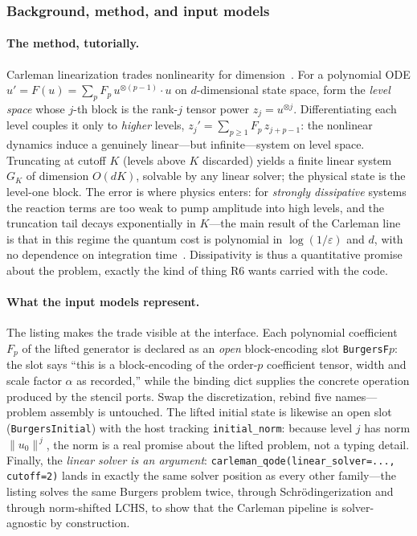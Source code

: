 \subsubsection{Background, method, and input models}
\label{app:carleman-method}

\paragraph{The method, tutorially.}
Carleman linearization trades nonlinearity for
dimension~\cite{liu2021pnas,liu2023carleman}.  For a polynomial ODE
$u'=F(u)=\sum_p F_p\,u^{\otimes(p-1)}\!\cdot u$ on $d$-dimensional state
space, form the \emph{level space} whose $j$-th block is the rank-$j$
tensor power $z_j = u^{\otimes j}$.  Differentiating each level couples it
only to \emph{higher} levels, $z_j' = \sum_{p\ge 1} F_p\, z_{j+p-1}$: the
nonlinear dynamics induce a genuinely linear---but infinite---system on
level space.  Truncating at cutoff $K$ (levels above $K$ discarded)
yields a finite linear system $G_K$ of dimension $O(dK)$, solvable by any
linear solver; the physical state is the level-one block.  The error is
where physics enters: for \emph{strongly dissipative} systems the
reaction terms are too weak to pump amplitude into high levels, and the
truncation tail decays exponentially in $K$---the main result of the
Carleman line is that in this regime the quantum cost is polynomial in
$\log(1/\varepsilon)$ and $d$, with no dependence on integration
time~\cite{liu2021pnas,liu2023carleman}.  Dissipativity is thus a
quantitative promise about the problem, exactly the kind of thing R6
wants carried with the code.

\paragraph{What the input models represent.}
The listing makes the trade visible at the interface.  Each polynomial
coefficient $F_p$ of the lifted generator is declared as an \emph{open}
block-encoding slot \texttt{BurgersF$p$}: the slot says ``this is a
block-encoding of the order-$p$ coefficient tensor, width and scale
factor $\alpha$ as recorded,'' while the binding dict supplies the
concrete operation produced by the stencil ports.  Swap the
discretization, rebind five names---problem assembly is untouched.  The
lifted initial state is likewise an open slot
(\texttt{BurgersInitial}) with the host tracking \texttt{initial\_norm}:
because level $j$ has norm $\lVert u_0\rVert^{\,j}$, the norm is a real
promise about the lifted problem, not a typing detail.  Finally, the
\emph{linear solver is an argument}: \texttt{carleman\_qode(linear\_solver=...,
cutoff=2)} lands in exactly the same solver position as every other
family---the listing solves the same Burgers problem twice, through
Schr\"odingerization and through norm-shifted LCHS, to show that the
Carleman pipeline is solver-agnostic by construction.

